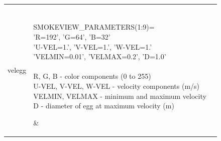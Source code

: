 \begin{longtable}[ht]{|l|l|c|}
{\ct velegg} &
\parbox[c]{\boxwidth}{
\hspace{1in} \\
{\ct SMOKEVIEW\_PARAMETERS(1:9)=} \\
{\ct 'R=192', 'G=64', 'B=32'} \\
{\ct 'U-VEL=1.', 'V-VEL=1.', 'W-VEL=1.'}  \\
{\ct 'VELMIN=0.01', 'VELMAX=0.2', 'D=1.0'} \\  \\
{\ct R, G, B} - color components (0 to 255) \\
{\ct U-VEL, V-VEL, W-VEL} - velocity components (m/s) \\
{\ct VELMIN, VELMAX} - minimum and maximum velocity\\
{\ct D} - diameter of egg at maximum velocity (m) \\
\hspace{1in}
} &
 \\ \hline

{\ct veltube} &
\parbox[c]{\boxwidth}{
\hspace{1in} \\
{\ct SMOKEVIEW\_PARAMETERS(1:9)=}\\
{\ct 'R=0', 'G=0',  'B=0'} \\
{\ct 'U-VEL=1.', 'V-VEL=1.', 'W-VEL=1.' }  \\
{\ct 'VELMIN=0.01', 'VELMAX=0.2', 'D=0.1'} \\  \\
{\ct R, G, B} - color components (0 to 255) \\
{\ct U-VEL, V-VEL, W-VEL} - velocity components (m/s) \\
{\ct VELMIN, VELMAX} - minimum and maximum velocity \\
{\ct D} - diameter of tube at {\ct VELMAX} (m) \\
\hspace{1in}
} &
 \\ \hline
\end{longtable}
